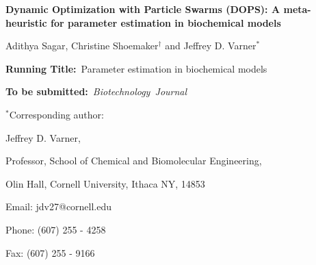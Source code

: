 \documentclass[12pt]{article}
\begin{document}
\begin{titlepage}
{\par\centering\textbf{\Large {Dynamic Optimization with Particle Swarms (DOPS): A meta-heuristic for parameter estimation in biochemical models}}}
\vspace{0.05in}
{\par \centering \large{Adithya Sagar, Christine Shoemaker$^{\dag}$ and Jeffrey D. Varner$^{*}$}}
\vspace{0.10in}
{\par {}}
{\par {}}
{\par {}}
\vspace{0.1in}
{\par \centering \textbf{Running Title:}~Parameter estimation in biochemical models}
\vspace{0.1in}
{\par \centering \textbf{To be submitted:}~\emph{Biotechnology~Journal}}
\vspace{0.5in}
{\par \centering $^{*}$Corresponding author:}
{\par \centering Jeffrey D. Varner,}
{\par \centering Professor, School of Chemical and Biomolecular Engineering,}
{\par {} Olin Hall, Cornell University, Ithaca NY, 14853}
{\par \centering Email: jdv27@cornell.edu}
{\par \centering Phone: (607) 255 - 4258}
{\par \centering Fax: (607) 255 - 9166}
\end{titlepage}
\date{}
\thispagestyle{empty}
\pagebreak
\end{document}

